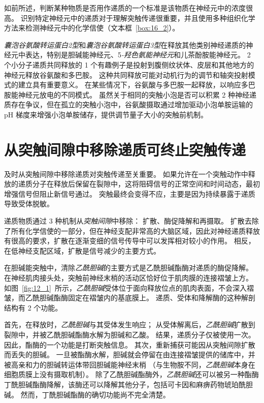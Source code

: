 如前所述，判断某种物质是否用作递质的一个标准是该物质在神经元中的浓度很高。
识别特定神经元中的递质对于理解突触传递很重要，并且使用多种组织化学方法来检测神经元中的化学信使（文本框~\ref{box:16_2}）。


\textit{囊泡谷氨酸转运蛋白2型}和\textit{囊泡谷氨酸转运蛋白3型}在释放其他类别神经递质的神经元中表达，特别是胆碱能神经元、5\textit{-羟色氨能神经元}和儿茶酚胺能神经元。
2 个小分子递质共同释放的 1 个有趣例子是投射到腹侧纹状体、皮层和其他地方的神经元释放谷氨酸和多巴胺。
这种共同释放可能对动机行为的调节和轴突投射模式的建立具有重要意义。
在某些情况下，谷氨酸与多巴胺一起释放，以响应多巴胺能神经元放电的不同模式。
虽然关于相同的突触小泡是否可以积累 2 种神经递质存在争议，但在孤立的突触小泡中，谷氨酸摄取通过增加驱动小泡单胺运输的 pH 梯度来增强小泡单胺储存，提供调节量子大小的突触前机制。



\section{从突触间隙中移除递质可终止突触传递}

及时从突触间隙中移除递质对突触传递至关重要。
如果允许在一个突触动作中释放的递质分子在释放后保留在裂隙中，这将阻碍信号的正常空间和时间动态，最初增强信号但阻止新信号通过。
突触最终会变得不应，主要是因为持续暴露于递质导致受体脱敏。


递质物质通过 3 种机制从\textit{突触间隙}中移除：
扩散、酶促降解和再摄取。
扩散去除了所有化学信使的一部分，但在神经支配非常高的大脑区域，因此对神经递质释放有很高的要求，扩散在逐渐变细的信号传导中可以发挥相对较小的作用。
相反，在低神经支配区域，扩散是信号减少的主要方式。


在胆碱能突触中，清除\textit{乙酰胆碱}的主要方式是乙酰胆碱酯酶对递质的酶促降解。
在神经肌肉接头处，突触前神经末梢的活动区恰好位于肌肉膜的连接褶皱上方。
如图~\ref{fig:12_1}~所示，\textit{乙酰胆碱}受体位于面向释放位点的肌肉表面，不会深入褶皱，而乙酰胆碱酯酶固定在褶皱内的基底膜上。
递质、受体和降解酶的这种解剖结构有 2 个功能。


首先，在释放时，\textit{乙酰胆碱}与其受体发生响应；
从受体解离后，\textit{乙酰胆碱}扩散到裂隙中，并被乙酰胆碱酯酶水解为胆碱和乙酸。
结果，递质分子仅被使用一次。
因此，酯酶的一个功能是打断突触信息。
其次，重新捕获可能因从突触间隙扩散而丢失的胆碱。
一旦被酯酶水解，胆碱就会停留在由连接褶皱提供的储库中，并被高亲和力的胆碱转运体带回胆碱能神经末梢
（与生物胺不同，\textit{乙酰胆碱}本身在细胞质膜上没有摄取机制）。
除了乙酰胆碱酯酶外，\textit{乙酰胆碱}还可以被另一种酯酶丁酰胆碱酯酶降解，该酶还可以降解其他分子，包括可卡因和麻痹药物琥珀酰胆碱。
然而，丁酰胆碱酯酶的确切功能尚不完全清楚。


